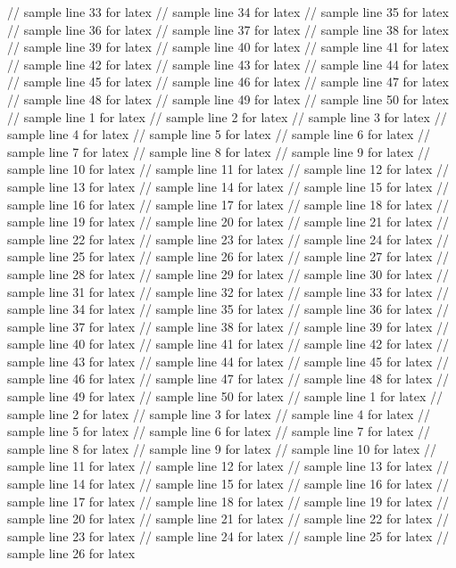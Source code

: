 // sample line 33 for latex
// sample line 34 for latex
// sample line 35 for latex
// sample line 36 for latex
// sample line 37 for latex
// sample line 38 for latex
// sample line 39 for latex
// sample line 40 for latex
// sample line 41 for latex
// sample line 42 for latex
// sample line 43 for latex
// sample line 44 for latex
// sample line 45 for latex
// sample line 46 for latex
// sample line 47 for latex
// sample line 48 for latex
// sample line 49 for latex
// sample line 50 for latex
// sample line 1 for latex
// sample line 2 for latex
// sample line 3 for latex
// sample line 4 for latex
// sample line 5 for latex
// sample line 6 for latex
// sample line 7 for latex
// sample line 8 for latex
// sample line 9 for latex
// sample line 10 for latex
// sample line 11 for latex
// sample line 12 for latex
// sample line 13 for latex
// sample line 14 for latex
// sample line 15 for latex
// sample line 16 for latex
// sample line 17 for latex
// sample line 18 for latex
// sample line 19 for latex
// sample line 20 for latex
// sample line 21 for latex
// sample line 22 for latex
// sample line 23 for latex
// sample line 24 for latex
// sample line 25 for latex
// sample line 26 for latex
// sample line 27 for latex
// sample line 28 for latex
// sample line 29 for latex
// sample line 30 for latex
// sample line 31 for latex
// sample line 32 for latex
// sample line 33 for latex
// sample line 34 for latex
// sample line 35 for latex
// sample line 36 for latex
// sample line 37 for latex
// sample line 38 for latex
// sample line 39 for latex
// sample line 40 for latex
// sample line 41 for latex
// sample line 42 for latex
// sample line 43 for latex
// sample line 44 for latex
// sample line 45 for latex
// sample line 46 for latex
// sample line 47 for latex
// sample line 48 for latex
// sample line 49 for latex
// sample line 50 for latex
// sample line 1 for latex
// sample line 2 for latex
// sample line 3 for latex
// sample line 4 for latex
// sample line 5 for latex
// sample line 6 for latex
// sample line 7 for latex
// sample line 8 for latex
// sample line 9 for latex
// sample line 10 for latex
// sample line 11 for latex
// sample line 12 for latex
// sample line 13 for latex
// sample line 14 for latex
// sample line 15 for latex
// sample line 16 for latex
// sample line 17 for latex
// sample line 18 for latex
// sample line 19 for latex
// sample line 20 for latex
// sample line 21 for latex
// sample line 22 for latex
// sample line 23 for latex
// sample line 24 for latex
// sample line 25 for latex
// sample line 26 for latex

